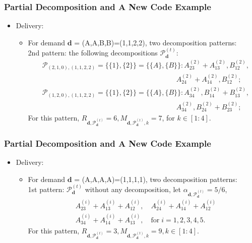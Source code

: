 \documentclass{beamer}
\begin{document}
\begin{frame}
\frametitle{Partial Decomposition and A New Code Example}
\begin{itemize}
\item Delivery:
	\begin{itemize}
	[circle]
	\item For demand $\boldsymbol{d}$ = (A,A,B,B)=(1,1,2,2), two decomposition patterns: \\
	2nd pattern: the following decompositions $\boldsymbol{\mathcal{P}}_{\boldsymbol{d}}^{(t)}$:
	\begin{align*}
	& \mathcal{P}_{(2,1,0),(1,1,2,2)} = \{\{1\},\{2\}\} = \{\{A\},\{B\}\}: A_{23}^{(2)}+A_{13}^{(2)}, B_{12}^{(2)}, \\
	& \qquad \qquad \qquad  \qquad \qquad \qquad \qquad \qquad \qquad \quad A_{24}^{(2)}+A_{14}^{(2)},B_{12}^{(2)}; \\
	& \mathcal{P}_{(1,2,0),(1,1,2,2)} =  \{\{1\},\{2\}\} = \{\{A\},\{B\}\}: A_{34}^{(2)}, B_{14}^{(2)} + B_{13}^{(2)},\\
	& \qquad \qquad \qquad  \qquad \qquad \qquad \qquad \qquad \qquad \quad  A_{34}^{(2)}, B_{24}^{(2)}+B_{23}^{(2)};
	\end{align*}
	For this pattern, $R_{\boldsymbol{d},\boldsymbol{\mathcal{P}}_{\boldsymbol{d}}^{(t)}} = 6, M_{\boldsymbol{d},\boldsymbol{\mathcal{P}}_{\boldsymbol{d}}^{(t)},k} = 7$, for $k \in [1:4]$.
	\end{itemize}
\end{itemize}
\end{frame}

\begin{frame}
\frametitle{Partial Decomposition and A New Code Example}
\begin{itemize}
\item Delivery:
	\begin{itemize}
	[circle]
	\item For demand $\boldsymbol{d}$ = (A,A,A,A)=(1,1,1,1), two decomposition patterns: \\
	1st pattern: $\boldsymbol{\mathcal{P}}_{\boldsymbol{d}}^{(t)}$ without any decomposition, let $\alpha_{\boldsymbol{d},\boldsymbol{\mathcal{P}}_{\boldsymbol{d}}^{(t)}}=5/6$,
	\begin{align*}
	& A_{23}^{(i)} +A_{13}^{(i)}+A_{12}^{(i)}, \quad  A_{24}^{(i)} +A_{14}^{(i)}+A_{12}^{(i)} \\
	& A_{34}^{(i)} +A_{14}^{(i)}+A_{13}^{(i)}, \quad \text{for} \; i = 1,2,3,4,5.
	\end{align*}
	For this pattern, $R_{\boldsymbol{d},\boldsymbol{\mathcal{P}}_{\boldsymbol{d}}^{(t)}} = 3, M_{\boldsymbol{d},\boldsymbol{\mathcal{P}}_{\boldsymbol{d}}^{(t)},k} = 9, k \in [1:4].$
	\end{itemize}
\end{itemize}
\end{frame}
\end{document}
